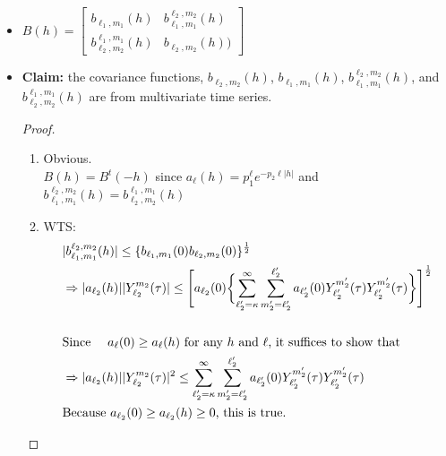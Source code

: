 \documentclass[11pt]{article}
\begin{document}
\begin{itemize}
\item
$B(h)= 
\begin{bmatrix}
b_{\ell_1,m_1}(h) & b_{\ell_1,m_1}^{\ell_2,m_2}(h) \\ 
b_{\ell_2,m_2}^{\ell_1,m_1}(h) & b_{\ell_2,m_2}(h)) 
\end{bmatrix}$

\item
\textbf{Claim:} the covariance functions, $b_{\ell_2,m_2}(h)$, $b_{\ell_1,m_1}(h)$, $b_{\ell_1,m_1}^{\ell_2,m_2}(h)$, and $b_{\ell_2,m_2}^{\ell_1,m_1}(h)$ are from multivariate time series.\\

\begin{proof}
\begin{enumerate}
\item
Obvious.\\
$B(h)=B^t(-h)$ since $a_\ell(h)=p_1^\ell e^{-p_2 \ell |h|}$ and $b_{\ell_1,m_1}^{\ell_2,m_2}(h) = b_{\ell_2,m_2}^{\ell_1,m_1}(h)$\\

\item
WTS:\\
\begin{align*}
&|b_{\ell_1,m_1}^{\ell_2,m_2}(h)| \le \{b_{\ell_1,m_1}(0) b_{\ell_2,m_2}(0)\}^\frac{1}{2}\\
&\Rightarrow |a_{\ell_2}(h)||Y_{\ell_2}^{m_2}(\tau)| \le \Biggl[ a_{\ell_2}(0) \biggl\{ \sum_{\ell_2'=\kappa}^{\infty} \sum_{m_2'=\ell_2'}^{\ell_2'} a_{\ell_2'}(0) Y_{\ell_2'}^{m_2'}(\tau) Y_{\ell_2'}^{m_2'}(\tau) \biggl\} \Biggl]^\frac{1}{2}\\
\\
&\text{Since \quad $a_{\ell}(0) \ge a_{\ell}(h)$ for any $h$ and $\ell$, it suffices to show that }\\
&\Rightarrow |a_{\ell_2}(h)||Y_{\ell_2}^{m_2}(\tau)|^2 \le \sum_{\ell_2'=\kappa}^{\infty} \sum_{m_2'=\ell_2'}^{\ell_2'} a_{\ell_2'}(0) Y_{\ell_2'}^{m_2'}(\tau) Y_{\ell_2'}^{m_2'}(\tau)\\
&\text{Because $a_{\ell_2}(0) \ge a_{\ell_2}(h)  \ge 0$, this is true.}\\
\end{align*}


\end{enumerate}
\end{proof}
\end{itemize}
\end{document}
